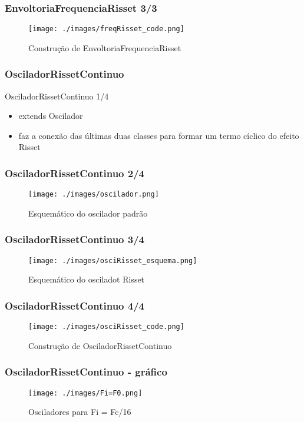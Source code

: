 \documentclass{beamer}
\begin{document}
\begin{frame}
 \frametitle{EnvoltoriaFrequenciaRisset 3/3}
 \begin{figure}
  \texttt{[image: ./images/freqRisset\_code.png]}
  \caption{Construção de EnvoltoriaFrequenciaRisset}
   \end{figure}
\end{frame}

\subsubsection{OsciladorRissetContinuo}
\begin{frame}{OsciladorRissetContinuo 1/4}
\begin{itemize}
	\item extends Oscilador
	\item faz a conexão das últimas duas classes para formar um termo
	cíclico do efeito Risset
\end{itemize}
\end{frame}

\begin{frame}
 \frametitle{OsciladorRissetContinuo 2/4}
 \begin{figure}
  \texttt{[image: ./images/oscilador.png]}
  \caption{Esquemático do oscilador padrão}
   \end{figure}
\end{frame}

\begin{frame}
 \frametitle{OsciladorRissetContinuo 3/4}
 \begin{figure}
  \texttt{[image: ./images/osciRisset\_esquema.png]}
  \caption{Esquemático do osciladot Risset}
   \end{figure}
\end{frame}

\begin{frame}
 \frametitle{OsciladorRissetContinuo 4/4}
 \begin{figure}
  \texttt{[image: ./images/osciRisset\_code.png]}
  \caption{Construção de OsciladorRissetContinuo}
   \end{figure}
\end{frame}

\begin{frame}
 \frametitle{OsciladorRissetContinuo - gráfico}
 \begin{figure}
  \texttt{[image: ./images/Fi=F0.png]}
\caption{Osciladores para Fi = Fc/16}  
    \end{figure}
\end{frame}
\end{document}
